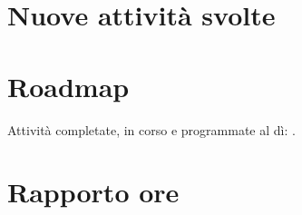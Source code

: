 %

\showlogo{\doclogo}

\renewcommand{\arraystretch}{1.5}

\section{Nuove attivit\`a svolte}
\legendaModalita
\vspace{6mm}

\newpage
\section{Roadmap}
Attivit\`a completate, in corso e programmate al d\`i: \docdata.
\\[2mm]
\legendaStato
\vspace{4mm}

\newpage
\section{Rapporto ore}


\saldodovuto
